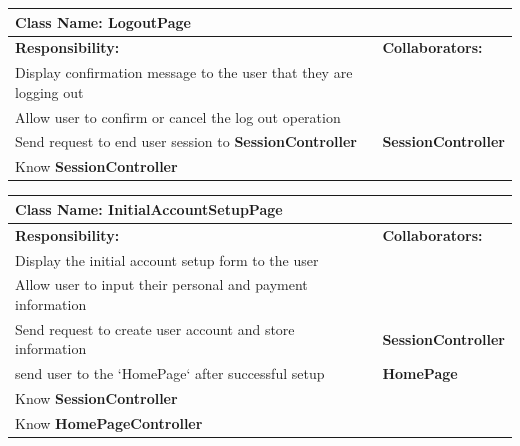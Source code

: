 \documentclass[]{article}
\begin{document}
\begin{table}[H]
    \centering
    \begin{tabular}{|p{5cm}|p{5cm}|}
    \hline 
     \multicolumn{2}{|l|}{\textbf{Class Name:} LogoutPage} \\
    \hline
    \textbf{Responsibility:} & \textbf{Collaborators:} \\
    \hline
    Display confirmation message to the user that they are logging out &  \phantom{} \\
    \hline
    Allow user to confirm or cancel the log out operation & \phantom{} \\
    \hline
    Send request to end user session to \textbf{SessionController} & \textbf{SessionController} \\
    \hline
    Know \textbf{SessionController}  & \phantom{} \\
    \hline
    
    \end{tabular}
\end{table}

\begin{table}[H]
    \centering
    \begin{tabular}{|p{5cm}|p{5cm}|}
    \hline 
     \multicolumn{2}{|l|}{\textbf{Class Name:} InitialAccountSetupPage} \\
    \hline
    \textbf{Responsibility:} & \textbf{Collaborators:} \\
    \hline
    Display the initial account setup form to the user &  \phantom{} \\
    \hline
    Allow user to input their personal and payment information & \phantom{} \\
    \hline
    Send request to create user account and store information  & \textbf{SessionController} \\
    \hline
    send user to the `HomePage` after successful setup & \textbf{HomePage} \\
    \hline
     Know \textbf{SessionController}  & \phantom{} \\
    \hline
     Know \textbf{HomePageController}  & \phantom{} \\
    \hline
    \end{tabular}
\end{table}
\end{document}
